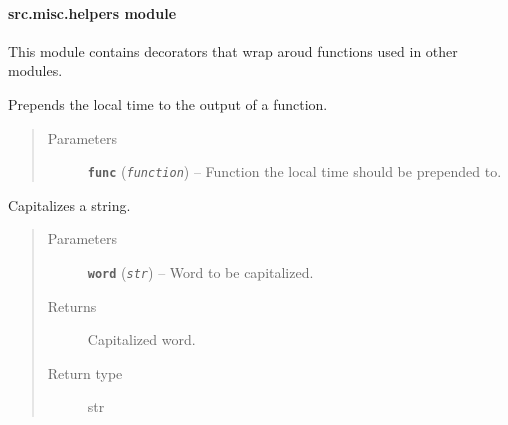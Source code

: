 \documentclass[letterpaper,10pt,english]{sphinxmanual}
\begin{document}
\paragraph{src.misc.helpers module}
\label{src.misc:src-misc-helpers-module}\label{src.misc:module-src.misc.helpers}
This module contains decorators that wrap aroud functions used in other modules.

\begin{fulllineitems}
\label{src.misc:src.misc.helpers.alt}
Prepends the local time to the output of a function.
\begin{quote}\begin{description}
\item[{Parameters}] \leavevmode
\textbf{\texttt{func}} (\emph{\texttt{function}}) -- Function the local time should be prepended to.

\end{description}\end{quote}

\end{fulllineitems}


\begin{fulllineitems}
\label{src.misc:src.misc.helpers.capitalize}
Capitalizes a string.
\begin{quote}\begin{description}
\item[{Parameters}] \leavevmode
\textbf{\texttt{word}} (\emph{\texttt{str}}) -- Word to be capitalized.

\item[{Returns}] \leavevmode
Capitalized word.

\item[{Return type}] \leavevmode
str

\end{description}\end{quote}

\end{fulllineitems}

\end{document}
